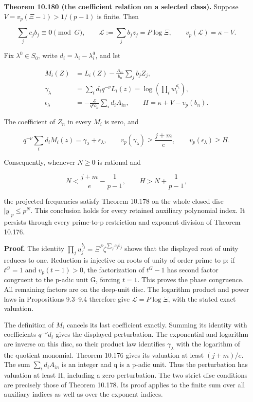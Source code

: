 \documentclass[
  11pt,
  a4paper,
]{article}
\begin{document}
\textbf{Theorem 10.180 (the coefficient relation on a selected class).}
Suppose \(V=v_p(\Xi-1)>1/(p-1)\) is finite. Then

\[
\sum_j c_jb_j\equiv0\pmod G,\qquad
\mathcal L:=\sum_j b_jz_j=P\log\Xi,\qquad
v_p(\mathcal L)=\kappa+V.
\tag{10.681}
\]

Fix \(\lambda^0\in S_0\), write \(d_i=\lambda_i-\lambda_i^0\), and let

\[
\begin{aligned}
M_i(Z)&=L_i(Z)-\frac{A_{in}}{b_n}\sum_jb_jZ_j,\\
\gamma_\lambda&=\sum_i d_iq^{-\nu}L_i(z)
 =\log\left(\prod_iw_i^{d_i}\right),\\
\epsilon_\lambda&=-\frac{\mathcal L}{q^\nu b_n}
                         \sum_i d_iA_{in},\qquad
H=\kappa+V-v_p(b_n).
\end{aligned}
\tag{10.682}
\]

The coefficient of \(Z_n\) in every \(M_i\) is zero, and

\[
q^{-\nu}\sum_i d_iM_i(z)
 =\gamma_\lambda+\epsilon_\lambda,\qquad
v_p(\gamma_\lambda)\ge\frac{j+m}{e},\qquad
v_p(\epsilon_\lambda)\ge H.
\tag{10.683}
\]

Consequently, whenever \(N\ge0\) is rational and

\[
N<\frac{j+m}{e}-\frac1{p-1},\qquad H>N+\frac1{p-1},
\tag{10.684}
\]

the projected frequencies satisfy Theorem 10.178 on the whole closed
disc \(|y|_p\le p^N\). This conclusion holds for every retained
auxiliary polynomial index. It persists through every prime-to-p
restriction and exponent division of Theorem 10.176.

\textbf{Proof.} The identity
\(\prod_j u_j^{b_j}=\Xi^P\zeta^{\sum_jc_jb_j}\) shows that the displayed
root of unity reduces to one. Reduction is injective on roots of unity
of order prime to p: if \(t^G=1\) and \(v_p(t-1)>0\), the factorization
of \(t^G-1\) has second factor congruent to the p-adic unit G, forcing
\(t=1\). This proves the phase congruence. All remaining factors are on
the deep-unit disc. The logarithm product and power laws in Propositions
9.3--9.4 therefore give \(\mathcal L=P\log\Xi\), with the stated exact
valuation.

The definition of \(M_i\) cancels its last coefficient exactly. Summing
its identity with coefficients \(q^{-\nu}d_i\) gives the displayed
perturbation. The exponential and logarithm are inverse on this disc, so
their product law identifies \(\gamma_\lambda\) with the logarithm of
the quotient monomial. Theorem 10.176 gives its valuation at least
\((j+m)/e\). The sum \(\sum_i d_iA_{in}\) is an integer and q is a
p-adic unit. Thus the perturbation has valuation at least H, including a
zero perturbation. The two strict disc conditions are precisely those of
Theorem 10.178. Its proof applies to the finite sum over all auxiliary
indices as well as over the exponent indices.
\end{document}
